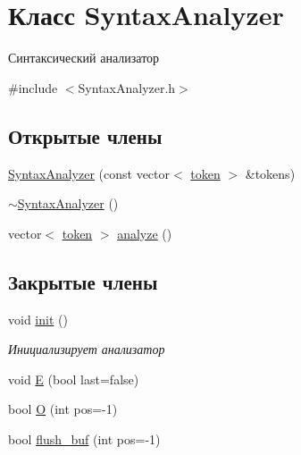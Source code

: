 \hypertarget{class_syntax_analyzer}{}\section{Класс Syntax\+Analyzer}
\label{class_syntax_analyzer}


Синтаксический анализатор  




{\ttfamily \#include $<$Syntax\+Analyzer.\+h$>$}

\subsection*{Открытые члены}
\begin{DoxyCompactItemize}
\item 
\hyperlink{class_syntax_analyzer_af4bb6b4b5a638914d5851082dd7a1669}{Syntax\+Analyzer} (const vector$<$ \hyperlink{structtoken}{token} $>$ \&tokens)
\item 
\hyperlink{class_syntax_analyzer_a29b52995ad07154244f129673dae5a01}{$\sim$\+Syntax\+Analyzer} ()
\item 
vector$<$ \hyperlink{structtoken}{token} $>$ \hyperlink{class_syntax_analyzer_a04fbf355b2afe30ef814048ecb029cf2}{analyze} ()
\end{DoxyCompactItemize}
\subsection*{Закрытые члены}
\begin{DoxyCompactItemize}
\item 
void \hyperlink{class_syntax_analyzer_a76c8c49d5154b9b48b11d241577420e4}{init} ()
\begin{DoxyCompactList}\small\item\em Инициализирует анализатор \end{DoxyCompactList}\item 
void \hyperlink{class_syntax_analyzer_a1b42fab3f30284bf29a7eff2f3e8382f}{E} (bool last=false)
\item 
bool \hyperlink{class_syntax_analyzer_a7a94734bb42224681a23045c45cd9ca3}{O} (int pos=-\/1)
\item 
bool \hyperlink{class_syntax_analyzer_aea363db29fd359d98711018d377f3301}{flush\+\_\+buf} (int pos=-\/1)
\end{DoxyCompactItemize}

